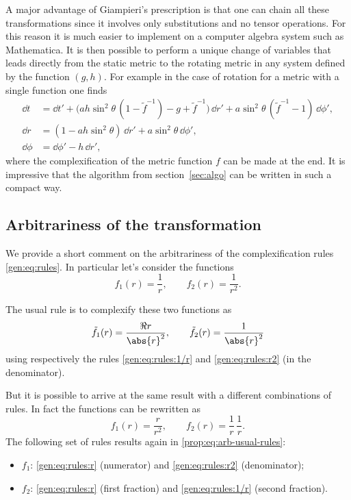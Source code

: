 A major advantage of Giampieri's prescription is that one can chain all these transformations since it involves only substitutions and no tensor operations.
For this reason it is much easier to implement on a computer algebra system such as Mathematica.
It is then possible to perform a unique change of variables that leads directly from the static metric to the rotating metric in any system defined by the function $(g, h)$.
For example in the case of rotation for a metric with a single function one finds
\begin{subequations}
\begin{align}
	\dd t &= \dd t' + \big(a h \sin^2 \theta\, (1 - \tilde f^{-1}) - g + \tilde f^{-1} \big)\, \dd r'
		+ a \sin^2 \theta\, (\tilde f^{-1} - 1)\, \dd \phi', \\
	\dd r &= (1 - a h \sin^2 \theta)\, \dd r' + a \sin^2 \theta\, \dd \phi', \\
	\dd \phi &= \dd \phi' - h\, \dd r',
\end{align}
\end{subequations}
where the complexification of the metric function $f$ can be made at the end.
It is impressive that the algorithm from section~\ref{sec:algo} can be written in such a compact way.


\subsection{Arbitrariness of the transformation}
\label{sec:jna-prop:arbitrariness}


We provide a short comment on the arbitrariness of the complexification rules \eqref{gen:eq:rules}.
In particular let's consider the functions
\begin{equation}
	f_1(r) = \frac{1}{r}, \qquad
	f_2(r) = \frac{1}{r^2}.
\end{equation} 

The usual rule is to complexify these two functions as
\begin{equation}
	\label{prop:eq:arb-usual-rules}
	\tilde f_1(r) = \frac{\Re r}{\abs{r}^2}, \qquad
	\tilde f_2(r) = \frac{1}{\abs{r}^2}
\end{equation} 
using respectively the rules \eqref{gen:eq:rules:1/r} and \eqref{gen:eq:rules:r2} (in the denominator).

But it is possible to arrive at the same result with a different combinations of rules.
In fact the functions can be rewritten as
\begin{equation}
	f_1(r) = \frac{r}{r^2}, \qquad
	f_2(r) = \frac{1}{r}\, \frac{1}{r}.
\end{equation} 
The following set of rules results again in \eqref{prop:eq:arb-usual-rules}:
\begin{itemize}
	\item $f_1$: \eqref{gen:eq:rules:r} (numerator) and \eqref{gen:eq:rules:r2} (denominator);
	\item $f_2$: \eqref{gen:eq:rules:r} (first fraction) and \eqref{gen:eq:rules:1/r} (second fraction).
\end{itemize}

